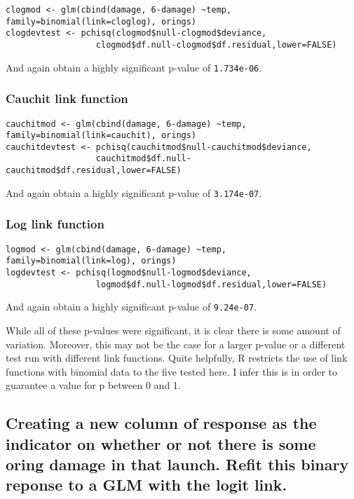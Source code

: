 \documentclass[11pt]{article}
\begin{document}
\begin{verbatim}
clogmod <- glm(cbind(damage, 6-damage) ~temp, family=binomial(link=cloglog), orings)
clogdevtest <- pchisq(clogmod$null-clogmod$deviance,
                  clogmod$df.null-clogmod$df.residual,lower=FALSE)
\end{verbatim}

And again obtain a highly significant p-value of \texttt{1.734e-06}.
\subsubsection{Cauchit link function}
\label{sec-2-2-3}



\begin{verbatim}
cauchitmod <- glm(cbind(damage, 6-damage) ~temp, family=binomial(link=cauchit), orings)
cauchitdevtest <- pchisq(cauchitmod$null-cauchitmod$deviance,
                  cauchitmod$df.null-cauchitmod$df.residual,lower=FALSE)
\end{verbatim}

And again obtain a highly significant p-value of
\texttt{3.174e-07}.
\subsubsection{Log link function}
\label{sec-2-2-4}



\begin{verbatim}
logmod <- glm(cbind(damage, 6-damage) ~temp, family=binomial(link=log), orings)
logdevtest <- pchisq(logmod$null-logmod$deviance,
                  logmod$df.null-logmod$df.residual,lower=FALSE)
\end{verbatim}

And again obtain a highly significant p-value of
\texttt{9.24e-07}.

While all of these p-values were significant, it is clear there is
some amount of variation. Moreover, this
may not be the case for a larger p-value or a different test run with
different link functions. Quite helpfully, R restricts the use of
link functions with binomial data to the five tested here. I infer
this is in order to guarantee a value for p between 0 and 1.
\subsection{Creating a new column of response as the indicator on whether or not there is some oring damage in that launch. Refit this binary reponse to a GLM with the logit link.}
\label{sec-2-3}
\end{document}
